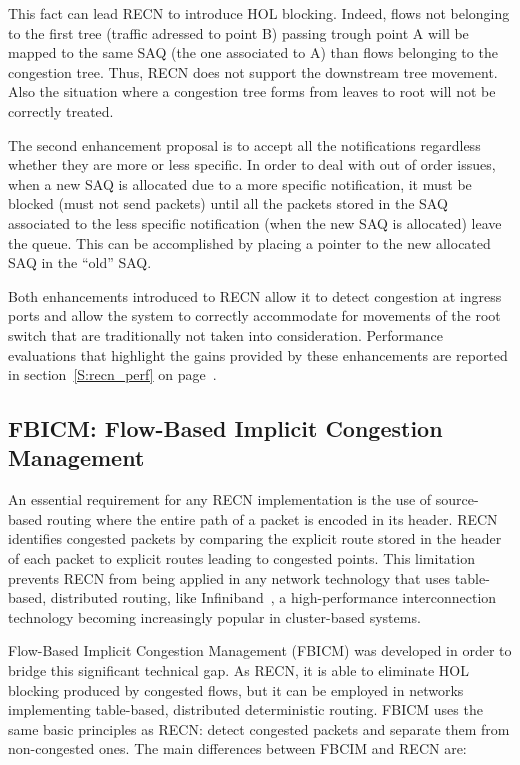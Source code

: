 \documentclass[12pt]{article}
\begin{document}
This fact can lead RECN to introduce HOL blocking. Indeed, flows not belonging to the first tree (traffic adressed to point B) passing trough point A will be mapped to the same SAQ (the one associated to A) than flows belonging to the congestion tree. Thus, RECN does not support the downstream tree movement. Also the situation where a congestion tree forms from leaves to root will not be correctly treated.

The second enhancement proposal is to accept all the notifications regardless whether they are more or less specific. In order to deal with out of order issues, when a new SAQ is allocated due to a more specific notification, it must be blocked (must not send packets) until all the packets stored in the SAQ associated to the less specific notification (when the new SAQ is allocated) leave the queue. This can be accomplished by placing a pointer to the new allocated SAQ in the “old” SAQ.

Both enhancements introduced to RECN allow it to detect congestion at ingress ports and allow the system to correctly accommodate for movements of the root switch that are traditionally not taken into consideration. Performance evaluations that highlight the gains provided by these enhancements are reported in section~\ref{S:recn_perf} on page~\pageref{S:recn_perf}.

\subsection{FBICM: Flow-Based Implicit Congestion Management}\label{S:fbicm}

An essential requirement for any RECN implementation is the use of source-based routing where the entire path of a packet is encoded in its header. RECN identifies congested packets by comparing the explicit route stored in the header of each packet to explicit routes leading to congested points. This limitation prevents RECN from being applied in any network technology that uses table-based, distributed routing, like Infiniband~\cite{infiniband}, a high-performance interconnection technology becoming increasingly popular in cluster-based systems.

Flow-Based Implicit Congestion Management (FBICM) was developed in order to bridge this significant technical gap. As RECN, it is able to eliminate HOL blocking produced by congested flows, but it can be employed in networks implementing table-based, distributed deterministic routing. FBICM uses the same basic principles as RECN: detect congested packets and separate them from non-congested ones. The main differences between FBCIM and RECN are:
\end{document}
